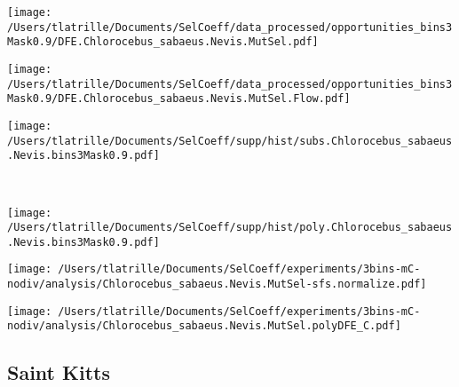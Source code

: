 \documentclass{article}
\begin{document}
    \begin{minipage}{0.32\linewidth}
        \texttt{[image: /Users/tlatrille/Documents/SelCoeff/data\_processed/opportunities\_bins3Mask0.9/DFE.Chlorocebus\_sabaeus.Nevis.MutSel.pdf]}
    \end{minipage}
    \begin{minipage}{0.32\linewidth}
        \texttt{[image: /Users/tlatrille/Documents/SelCoeff/data\_processed/opportunities\_bins3Mask0.9/DFE.Chlorocebus\_sabaeus.Nevis.MutSel.Flow.pdf]}
    \end{minipage}
    \begin{minipage}{0.32\linewidth}
        \texttt{[image: /Users/tlatrille/Documents/SelCoeff/supp/hist/subs.Chlorocebus\_sabaeus.Nevis.bins3Mask0.9.pdf]}
    \end{minipage}
    \\
    \begin{minipage}{0.32\linewidth}
        \texttt{[image: /Users/tlatrille/Documents/SelCoeff/supp/hist/poly.Chlorocebus\_sabaeus.Nevis.bins3Mask0.9.pdf]}
    \end{minipage}
    \begin{minipage}{0.32\linewidth}
        \texttt{[image: /Users/tlatrille/Documents/SelCoeff/experiments/3bins-mC-nodiv/analysis/Chlorocebus\_sabaeus.Nevis.MutSel-sfs.normalize.pdf]}
    \end{minipage}
    \begin{minipage}{0.32\linewidth}
        \texttt{[image: /Users/tlatrille/Documents/SelCoeff/experiments/3bins-mC-nodiv/analysis/Chlorocebus\_sabaeus.Nevis.MutSel.polyDFE\_C.pdf]}
    \end{minipage}
    \subsection{Saint Kitts}
\end{document}
